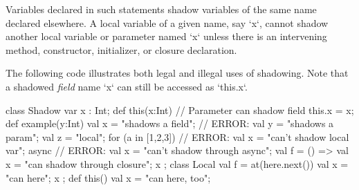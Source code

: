 Variables declared in such statements shadow variables of the same
name declared elsewhere.
A local variable of a given name, say \xcd`x`, cannot shadow another local
variable or parameter named \xcd`x` unless there is an intervening method,
constructor, initializer, or
closure declaration.

\begin{ex}
The following code illustrates both legal and illegal uses of shadowing.
Note that a shadowed {\em field} name \xcd`x` can still be accessed 
as \xcd`this.x`. 

\begin{xten}
class Shadow{
  var x : Int; 
  def this(x:Int) { 
     // Parameter can shadow field
     this.x = x; 
  }
  def example(y:Int) {
     val x = "shadows a field";
     // ERROR: val y = "shadows a param";
     val z = "local";
     for (a in [1,2,3]) {
        // ERROR: val x = "can't shadow local var";
     }
     async {
        // ERROR: val x = "can't shadow through async";
     }        
     val f = () => { 
       val x = "can shadow through closure";
       x
     };
     class Local {
        val f = at(here.next()){ val x = "can here"; x };
        def this() { val x = "can here, too"; }
     }
  }
}
\end{xten}
%



\end{ex}

